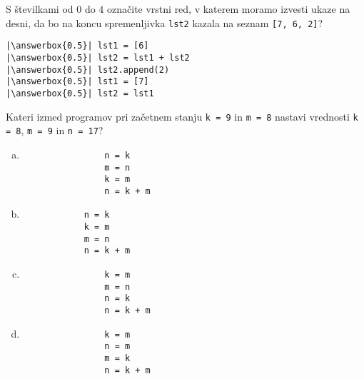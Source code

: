 \documentclass[arhiv, 10pt]{../izpit}
\newcommand{\inlinepy}[1]{\texttt{#1}}
\newcommand{\answerbox}[1]{\framebox{\vphantom{\large M}\hspace{#1cm}}}
\begin{document}
        \naloga*
        \begin{multicols}{2}
        \noindent 
        S številkami od $0$ do $4$ označite vrstni red, v katerem moramo izvesti ukaze na desni, da bo na koncu spremenljivka \inlinepy{lst2} kazala na seznam \inlinepy{[7, 6, 2]}?
    
        \columnbreak
        \noindent
        \begin{verbatim}
|\answerbox{0.5}| lst1 = [6]
|\answerbox{0.5}| lst2 = lst1 + lst2
|\answerbox{0.5}| lst2.append(2)
|\answerbox{0.5}| lst1 = [7]
|\answerbox{0.5}| lst2 = lst1

        \end{verbatim}
        \end{multicols}
    
            
        \naloga*
        
        Kateri izmed programov pri začetnem stanju
            \inlinepy{k = 9} in
            \inlinepy{m = 8}
        nastavi vrednosti
            \inlinepy{k = 8},
            \inlinepy{m = 9} in
            \inlinepy{n = 17}?
    
        \begin{multicols}{4}
        \begin{enumerate}[(a)]
\item 
                \begin{verbatim}
                n = k
                m = n
                k = m
                n = k + m
                \end{verbatim}
            
\item 
            \begin{verbatim}
            n = k
            k = m
            m = n
            n = k + m
            \end{verbatim}
        
\item 
                \begin{verbatim}
                k = m
                m = n
                n = k
                n = k + m
                \end{verbatim}
            
\item 
                \begin{verbatim}
                k = m
                n = m
                m = k
                n = k + m
                \end{verbatim}
            
\end{enumerate}

        \end{multicols}
    
\end{document}
